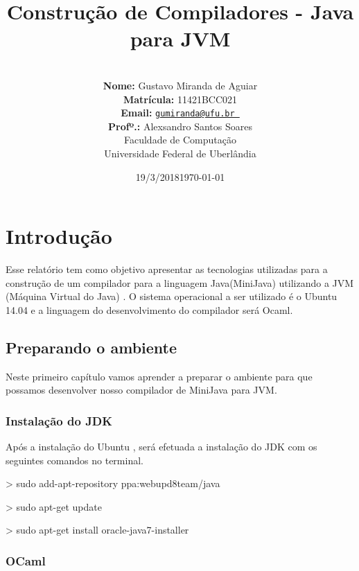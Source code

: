 \documentclass[12pt,a4paper,twoside]{report}
\title{Construção de Compiladores - Java para JVM}
\date{19/3/2018}
\author{  \\
\textbf{Nome:} Gustavo Miranda de Aguiar \\
\textbf{Matrícula:} 11421BCC021 \\
\textbf{Email:} \texttt{\small \url{gumiranda@ufu.br }}\\
\textbf{Profº.:} Alexsandro Santos Soares
\vspace{1cm} \\
Faculdade de Computação \\
Universidade Federal de Uberlândia
}
\date{\today}
\begin{document}
  \maketitle

\tableofcontents    


\fancyhead[RE,LO]{\thesection}

\setlength{\parskip}{0.15in} %
\chapter{Introdução}
Esse relatório tem como objetivo apresentar as tecnologias utilizadas para a construção de um compilador para a linguagem Java(MiniJava) utilizando a JVM (Máquina Virtual do Java) .
O sistema operacional a ser utilizado é o Ubuntu 14.04 e a linguagem do desenvolvimento do compilador será Ocaml.
\section{Preparando o ambiente}
Neste primeiro capítulo vamos aprender a preparar o ambiente para que possamos desenvolver
nosso compilador de MiniJava para JVM.
\subsection{Instalação do JDK}
Após a instalação do Ubuntu , será efetuada a instalação do JDK com os seguintes comandos no terminal. 


\begin{terminal}
> sudo add-apt-repository ppa:webupd8team/java
\end{terminal}


\begin{terminal}
> sudo apt-get update
\end{terminal}


\begin{terminal}
> sudo apt-get install oracle-java7-installer
\end{terminal}

\subsection{OCaml}
\end{document}
